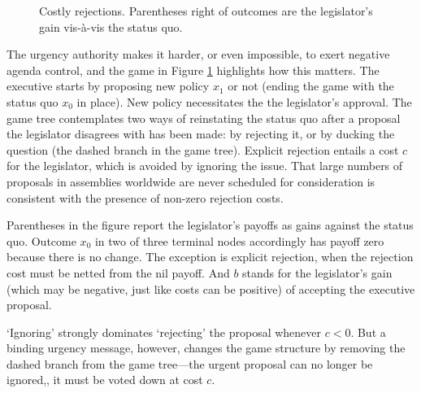 \documentclass[letter,12pt]{article}
\begin{document}
\begin{figure}
  \caption{Costly rejections. Parentheses right of outcomes are the legislator's gain vis-\`a-vis the status quo.}\label{f:costly}
\end{figure}


The urgency authority makes it harder, or even impossible, to exert negative agenda control, and the game in Figure \ref{f:costly} highlights how this matters. The executive starts by proposing new policy $x_1$ or not (ending the game with the status quo $x_0$ in place). New policy necessitates the the legislator's approval. The game tree contemplates two ways of reinstating the status quo after a proposal the legislator disagrees with has been made: by rejecting it, or by ducking the question (the dashed branch in the game tree). Explicit rejection entails a cost $c$ for the legislator, which is avoided by ignoring the issue. That large numbers of proposals in assemblies worldwide are never scheduled for consideration is consistent with the presence of non-zero rejection costs. 

Parentheses in the figure report the legislator's payoffs as gains against the status quo. Outcome $x_0$ in two of three terminal nodes accordingly has payoff zero because there is no change. The exception is explicit rejection, when the rejection cost must be netted from the nil payoff. And $b$ stands for the legislator's gain (which may be negative, just like costs can be positive) of accepting the executive proposal. 

`Ignoring' strongly dominates `rejecting' the proposal whenever $c<0$. But a binding urgency message, however, changes the game structure by removing the dashed branch from the game tree---the urgent proposal can no longer be ignored,, it must be voted down at cost $c$. 
\end{document}
